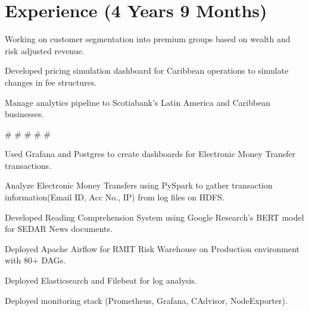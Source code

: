\documentclass[]{Vishnu-Resume}
\begin{document}
\hfill
\begin{minipage}[t]{0.66\textwidth} 


\section{Experience (4 Years 9 Months)}
\descript{}
\sectionsep
\sectionsep
\sectionsep
\sectionsep
\sectionsep
\sectionsep
\sectionsep
\sectionsep
\sectionsep
\sectionsep
\sectionsep
\sectionsep
\sectionsep
\sectionsep
\sectionsep
\begin{tightemize}
\item Working on customer segmentation into premium groups based on wealth and risk adjusted revenue.
\item Developed pricing simulation dashboard for Caribbean operations to simulate changes in fee structures.
\item Manage analytics pipeline to Scotiabank's Latin America and Caribbean businesses.
\end{tightemize}
\#  \#  \# \#  \#
\sectionsep

\begin{tightemize}
\item Used Grafana and Postgres to create dashboards for Electronic Money Transfer transactions.
\item Analyze Electronic Money Transfers using PySpark to gather transaction information(Email ID, Acc No., IP) from log files on HDFS.
\item Developed Reading Comprehension System using Google Research's BERT model for SEDAR News documents.
\end{tightemize}
\sectionsep

\begin{tightemize}
\item Deployed Apache Airflow for RMIT Risk Warehouse on Production environment with 80+ DAGs.
\item Deployed Elasticsearch and Filebeat for log analysis.
\item Deployed monitoring stack (Prometheus, Grafana, CAdvisor, NodeExporter).
\end{tightemize}
\sectionsep


\end{minipage}
\end{document}
